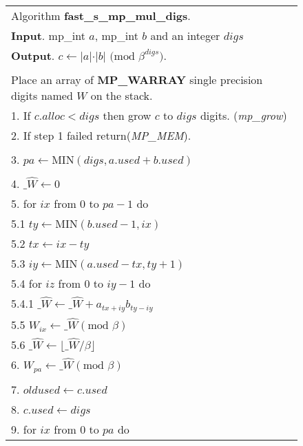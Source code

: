 \documentclass[b5paper]{book}
\begin{document}
\newpage\begin{figure}[!here]
\begin{small}
\begin{center}
\begin{tabular}{l}
\hline Algorithm \textbf{fast\_s\_mp\_mul\_digs}. \\
\textbf{Input}.   mp\_int $a$, mp\_int $b$ and an integer $digs$ \\
\textbf{Output}.  $c \leftarrow \vert a \vert \cdot \vert b \vert \mbox{ (mod }\beta^{digs}\mbox{)}$. \\
\hline \\
Place an array of \textbf{MP\_WARRAY} single precision digits named $W$ on the stack. \\
1.  If $c.alloc < digs$ then grow $c$ to $digs$ digits. (\textit{mp\_grow}) \\
2.  If step 1 failed return(\textit{MP\_MEM}).\\
\\
3.  $pa \leftarrow \mbox{MIN}(digs, a.used + b.used)$ \\
\\
4.  $\_ \hat W \leftarrow 0$ \\
5.  for $ix$ from 0 to $pa - 1$ do \\
\hspace{3mm}5.1  $ty \leftarrow \mbox{MIN}(b.used - 1, ix)$ \\
\hspace{3mm}5.2  $tx \leftarrow ix - ty$ \\
\hspace{3mm}5.3  $iy \leftarrow \mbox{MIN}(a.used - tx, ty + 1)$ \\
\hspace{3mm}5.4  for $iz$ from 0 to $iy - 1$ do \\
\hspace{6mm}5.4.1  $\_ \hat W \leftarrow \_ \hat W + a_{tx+iy}b_{ty-iy}$ \\
\hspace{3mm}5.5  $W_{ix} \leftarrow \_ \hat W (\mbox{mod }\beta)$\\
\hspace{3mm}5.6  $\_ \hat W \leftarrow \lfloor \_ \hat W / \beta \rfloor$ \\
6.  $W_{pa} \leftarrow \_ \hat W (\mbox{mod }\beta)$ \\
\\
7.  $oldused \leftarrow c.used$ \\
8.  $c.used \leftarrow digs$ \\
9.  for $ix$ from $0$ to $pa$ do \\

\end{tabular}
\end{center}
\end{small}
\end{figure}
\end{document}
